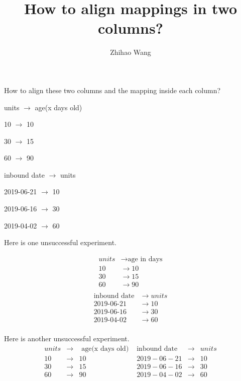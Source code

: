 \documentclass[12pt]{article}
\title{How to align mappings in two columns?}
\author{Zhihao Wang}
\begin{document}
\maketitle

How to align these two columns and the mapping inside each column?

\begin{multicols}{2}
units $\rightarrow$ age(x days old)

10 $\rightarrow$ 10

30 $\rightarrow$ 15

60 $\rightarrow$ 90

\columnbreak

inbound date $\rightarrow$ units

2019-06-21 $\rightarrow$ 10

2019-06-16 $\rightarrow$ 30

2019-04-02 $\rightarrow$ 60
\end{multicols}

Here is one unsuccessful experiment. 
\begin{multicols}{2}
\begin{align*}
    units & \rightarrow \text{age in days} \\ 
     10 & \rightarrow 10 \\ 
     30 & \rightarrow 15 \\ 
     60 & \rightarrow 90 \\ 
\end{align*}
\columnbreak
\begin{align*}
    \text{inbound date} & \rightarrow units \\ 
    \text{2019-06-21} & \rightarrow 10 \\ 
    \text{2019-06-16} & \rightarrow 30 \\ 
    \text{2019-04-02} & \rightarrow 60 \\ 
\end{align*}
\end{multicols}

Here is another unsuccessful experiment. 
\begin{equation*}
\begin{aligned}
    units & \rightarrow & \text{ age(x days old) }  & \text{inbound date} & \rightarrow & units \\
    10 & \rightarrow & 10                           &  2019-06-21 & \rightarrow & 10   \\
    30 & \rightarrow & 15                           &  2019-06-16 & \rightarrow & 30   \\
    60 & \rightarrow & 90                           &  2019-04-02 & \rightarrow & 60   \\
\end{aligned}
\end{equation*}
\end{document}
